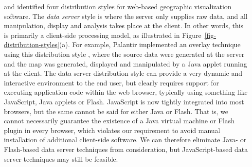 \documentclass[acmtocl,acmnow]{acmtrans2m}
\begin{document}
 and  identified four
distribution styles for web-based geographic visualization software. The
\emph{data server} style is where the server only supplies raw data, and
all manipulation, display and analysis takes place at the client. In
other words, this is primarily a client-side processing model, as
illustrated in Figure~\ref{fig-distribution-styles}(a). For example,
Palantir implemented an overlay technique using this distribution style
\cite{Papa-N-1998-Palantir}, where the source data were generated at the
server and the map was generated, displayed and manipulated by a Java
applet running at the client. The data server distribution style can
provide a very dynamic and interactive environment to the end user, but
clearly requires support for executing application code within the web
browser, typically using something like JavaScript, Java applets or
Flash. JavaScript is now tightly integrated into most browsers, but the
same cannot be said for either Java or Flash. That is, we cannot
necessarily guarantee the existence of a Java virtual machine or Flash
plugin in every browser, which violates our requirement to avoid manual
installation of additional client-side software. We can therefore
eliminate Java- or Flash-based data server techniques from
consideration, but JavaScript-based data server techniques may still be
feasible.
\end{document}
